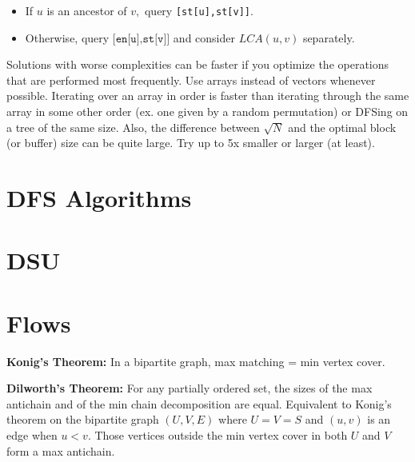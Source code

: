 		\begin{itemize}
		\item If $u$ is an ancestor of $v,$ query \texttt{[st[u],st[v]]}.
		\item Otherwise, query $\texttt{[en[u],st[v]]}$ and consider $LCA(u,v)$ separately.
		\end{itemize}

		Solutions with worse complexities can be faster if you optimize the operations that are performed most frequently. Use arrays instead of vectors whenever possible. Iterating over an array in order is faster than iterating through the same array in some other order (ex. one given by a random permutation) or DFSing on a tree of the same size. Also, the difference between $\sqrt N$ and the optimal block (or buffer) size can be quite large. Try up to 5x smaller or larger (at least).


\section{DFS Algorithms}

\section{DSU}

\section{Flows}

	\textbf{Konig's Theorem:} In a bipartite graph, max matching = min vertex cover.

	\textbf{Dilworth's Theorem:} For any partially ordered set, the sizes of the max antichain and of the min chain decomposition are equal. Equivalent to Konig's theorem on the bipartite graph $(U,V,E)$ where $U=V=S$ and $(u,v)$ is an edge when $u<v$. Those vertices outside the min vertex cover in both $U$ and $V$ form a max antichain.


